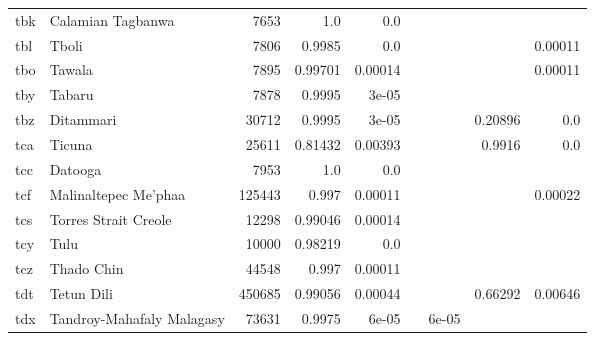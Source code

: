 \documentclass[11pt]{article}
\begin{document}
\begin{table*}[h]
{\begin{tabular}{llrrrrrrr}
tbk         & Calamian Tagbanwa         & 7653         & 1.0         & 0.0         &          &          &          &          \\

tbl         & Tboli         & 7806         & 0.9985         & 0.0         &          &          &          & 0.00011         \\

tbo         & Tawala         & 7895         & 0.99701         & 0.00014         &          &          &          & 0.00011         \\

tby         & Tabaru         & 7878         & 0.9995         & 3e-05         &          &          &          &          \\

tbz         & Ditammari         & 30712         & 0.9995         & 3e-05         &          &          & 0.20896         & 0.0         \\

tca         & Ticuna         & 25611         & 0.81432         & 0.00393         &          &          & 0.9916         & 0.0         \\

tcc         & Datooga         & 7953         & 1.0         & 0.0         &          &          &          &          \\

tcf         & Malinaltepec Me'phaa         & 125443         & 0.997         & 0.00011         &          &          &          & 0.00022         \\

tcs         & Torres Strait Creole         & 12298         & 0.99046         & 0.00014         &          &          &          &          \\

tcy         & Tulu         & 10000         & 0.98219         & 0.0         &          &          &          &          \\

tcz         & Thado Chin         & 44548         & 0.997         & 0.00011         &          &          &          &          \\

tdt         & Tetun Dili         & 450685         & 0.99056         & 0.00044         &          &          & 0.66292         & 0.00646         \\

tdx         & Tandroy-Mahafaly Malagasy         & 73631         & 0.9975         & 6e-05         &          & 6e-05         &          &          \\


\end{tabular}}
\end{table*}
\end{document}
